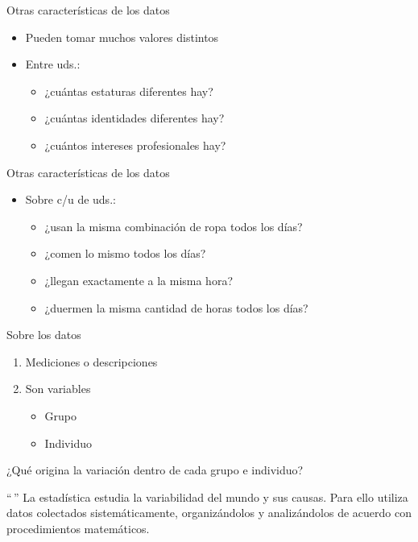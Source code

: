\documentclass[
  11pt,
  ignorenonframetext,
]{beamer}
\providecommand{\tightlist}{%
  \setlength{\itemsep}{0pt}\setlength{\parskip}{0pt}}
\begin{document}
\begin{frame}{Otras características de los datos}
\protect\hypertarget{otras-caracteruxedsticas-de-los-datos}{}
\begin{itemize}
\item
  Pueden tomar muchos valores distintos
\item
  Entre uds.:

  \begin{itemize}
  \tightlist
  \item
    ¿cuántas estaturas diferentes hay?
  \item
    ¿cuántas identidades diferentes hay?
  \item
    ¿cuántos intereses profesionales hay?
  \end{itemize}
\end{itemize}
\end{frame}

\begin{frame}{Otras características de los datos}
\protect\hypertarget{otras-caracteruxedsticas-de-los-datos-1}{}
\begin{itemize}
\item
  Sobre c/u de uds.:

  \begin{itemize}
  \tightlist
  \item
    ¿usan la misma combinación de ropa todos los días?
  \item
    ¿comen lo mismo todos los días?
  \item
    ¿llegan exactamente a la misma hora?
  \item
    ¿duermen la misma cantidad de horas todos los días?
  \end{itemize}
\end{itemize}
\end{frame}

\begin{frame}{Sobre los datos}
\protect\hypertarget{sobre-los-datos}{}
\begin{enumerate}
\item
  Mediciones o descripciones
\item
  Son variables

  \begin{itemize}
  \tightlist
  \item
    Grupo
  \item
    Individuo
  \end{itemize}
\end{enumerate}

¿Qué origina la variación dentro de cada grupo e individuo?
\end{frame}

\begin{frame}{``\,''}
\protect\hypertarget{section}{}
La estadística estudia la variabilidad del mundo y sus causas. Para ello
utiliza datos colectados sistemáticamente, organizándolos y
analizándolos de acuerdo con procedimientos matemáticos.
\end{frame}
\end{document}
